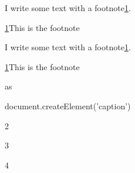 \documentclass{article}
\begin{document}
I write some text with a footnote\hyperlink{sdfootnote1sym}{1}.








\hyperlink{sdfootnote1anc}{1}This is the footnote












I write some text with a footnote\hyperlink{sdfootnote1sym}{1}.








\hyperlink{sdfootnote1anc}{1}This is the footnote


















as


document.createElement('caption')










2


3


4
\end{document}
